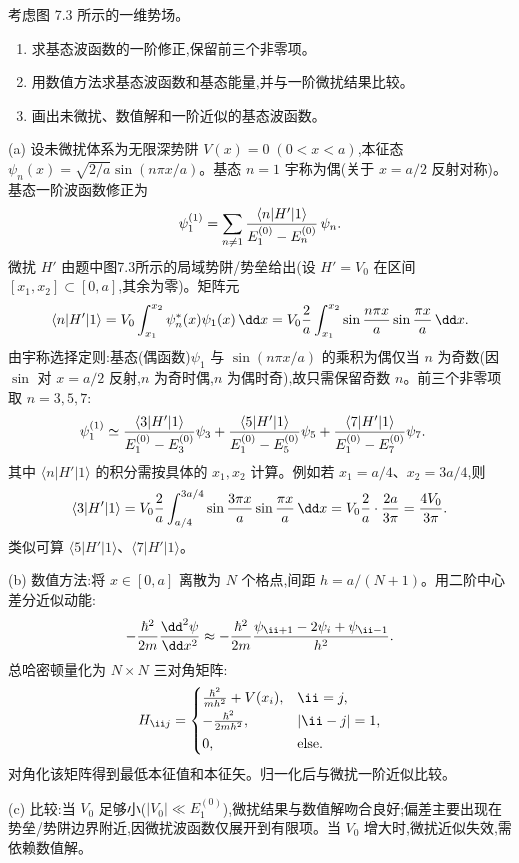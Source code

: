 \begin{question}
考虑图 7.3 所示的一维势场。
\begin{enumerate}
\item 求基态波函数的一阶修正,保留前三个非零项。
\item 用数值方法求基态波函数和基态能量,并与一阶微扰结果比较。
\item 画出未微扰、数值解和一阶近似的基态波函数。
\end{enumerate}
\end{question}
\begin{solution}
(a) 设未微扰体系为无限深势阱 $V(x)=0\;(0<x<a)$,本征态 $\psi_n(x)=\sqrt{2/a}\sin(n\pi x/a)$。基态 $n=1$ 宇称为偶(关于 $x=a/2$ 反射对称)。基态一阶波函数修正为
\[
\psi_1^{(1)}=\sum_{n\ne1}{\langle n|H'|1\rangle\over E_1^{(0)}-E_n^{(0)}}\,\psi_n.
\]
微扰 $H'$ 由题中图7.3所示的局域势阱/势垒给出(设 $H'=V_0$ 在区间 $[x_1,x_2]\subset[0,a]$,其余为零)。矩阵元
\[
\langle n|H'|1\rangle=V_0\int_{x_1}^{x_2}\psi_n^*(x)\psi_1(x)\,\dd x
=V_0{2\over a}\int_{x_1}^{x_2}\sin{n\pi x\over a}\sin{\pi x\over a}\,\dd x.
\]
由宇称选择定则:基态(偶函数)$\psi_1$ 与 $\sin(n\pi x/a)$ 的乘积为偶仅当 $n$ 为奇数(因 $\sin$ 对 $x=a/2$ 反射,$n$ 为奇时偶,$n$ 为偶时奇),故只需保留奇数 $n$。前三个非零项取 $n=3,5,7$:
\[
\begin{aligned}
\psi_1^{(1)}&\simeq
{\langle3|H'|1\rangle\over E_1^{(0)}-E_3^{(0)}}\psi_3
+{\langle5|H'|1\rangle\over E_1^{(0)}-E_5^{(0)}}\psi_5
+{\langle7|H'|1\rangle\over E_1^{(0)}-E_7^{(0)}}\psi_7.
\end{aligned}
\]
其中 $\langle n|H'|1\rangle$ 的积分需按具体的 $x_1,x_2$ 计算。例如若 $x_1=a/4$、$x_2=3a/4$,则
\[
\langle3|H'|1\rangle=V_0{2\over a}\int_{a/4}^{3a/4}\sin{3\pi x\over a}\sin{\pi x\over a}\,\dd x
=V_0{2\over a}\cdot{2a\over3\pi}={4V_0\over3\pi}.
\]
类似可算 $\langle5|H'|1\rangle$、$\langle7|H'|1\rangle$。

(b) 数值方法:将 $x\in[0,a]$ 离散为 $N$ 个格点,间距 $h=a/(N+1)$。用二阶中心差分近似动能:
\[
-{\hbar^2\over2m}{\dd^2\psi\over\dd x^2}
\approx -{\hbar^2\over2m}{\psi_{\ii+1}-2\psi_i+\psi_{\ii-1}\over h^2}.
\]
总哈密顿量化为 $N\times N$ 三对角矩阵:
\[
H_{\ii j}=
\begin{cases}
{\hbar^2\over m h^2}+V(x_i), & \ii=j,\\[2pt]
-{\hbar^2\over2m h^2}, & |\ii-j|=1,\\[2pt]
0, & \text{else}.
\end{cases}
\]
对角化该矩阵得到最低本征值和本征矢。归一化后与微扰一阶近似比较。

(c) 比较:当 $V_0$ 足够小($|V_0|\ll E_1^{(0)}$),微扰结果与数值解吻合良好;偏差主要出现在势垒/势阱边界附近,因微扰波函数仅展开到有限项。当 $V_0$ 增大时,微扰近似失效,需依赖数值解。
\end{solution}

